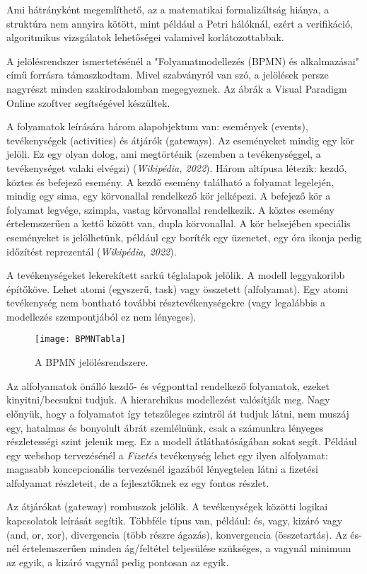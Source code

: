 \documentclass[12pt]{article}
\begin{document}
Ami hátrányként megemlíthető, az a matematikai formalizáltság hiánya, a struktúra nem annyira kötött, mint például a Petri hálóknál, ezért a verifikáció, algoritmikus vizsgálatok lehetőségei valamivel korlátozottabbak.

A jelölésrendszer ismertetésénél a "Folyamatmodellezés (BPMN) és alkalmazásai" című forrásra támaszkodtam. Mivel szabványról van szó, a jelölések persze nagyrészt minden szakirodalomban megegyeznek. Az ábrák a Visual Paradigm Online szoftver segítségével készültek.

A folyamatok leírására három alapobjektum van:  események (events), tevékenységek (activities) és átjárók (gateways).
Az eseményeket mindig egy kör jelöli. Ez egy olyan dolog, ami megtörténik (szemben a tevékenységgel, a tevékenységet valaki elvégzi) (\textit{Wikipédia, 2022}). Három altípusa létezik: kezdő, köztes és befejező esemény. A kezdő esemény található a folyamat legelején, mindig egy sima, egy körvonallal rendelkező kör jelképezi. A befejező kör a folyamat legvége, szimpla, vastag körvonallal rendelkezik. A köztes esemény értelemszerűen a kettő között van, dupla körvonallal. A kör belsejében speciális eseményeket is jelölhetünk, például egy boríték egy üzenetet, egy óra ikonja pedig időzítést reprezentál (\textit{Wikipédia, 2022}).

A tevékenységeket  lekerekített sarkú téglalapok jelölik. A modell leggyakoribb építőköve. Lehet atomi (egyszerű, task) vagy összetett (alfolyamat). Egy atomi tevékenység nem bontható további résztevékenységekre (vagy legalábbis a modellezés szempontjából ez nem lényeges).

\begin{figure}
\texttt{[image: BPMNTabla]}
\caption{A BPMN jelölésrendszere.}
\end{figure}

Az alfolyamatok önálló kezdő- és végponttal rendelkező folyamatok, ezeket kinyitni/becsukni tudjuk. A hierarchikus modellezést valósítják meg. Nagy előnyük, hogy a folyamatot így tetszőleges szintről át tudjuk látni, nem muszáj egy, hatalmas és bonyolult ábrát szemlélnünk, csak a számunkra lényeges részletességi szint jelenik meg. Ez a modell átláthatóságában sokat segít. Például egy webshop tervezésénél a \textit{Fizetés} tevékenység lehet egy ilyen alfolyamat: magasabb koncepcionális tervezésnél igazából lényegtelen látni a fizetési alfolyamat részleteit, de a fejlesztőknek ez egy fontos részlet.

Az átjárókat (gateway) rombuszok jelölik. A tevékenységek közötti logikai kapcsolatok leírását segítik. Többféle típus van, például: és, vagy, kizáró vagy (and, or, xor), divergencia (több részre ágazás), konvergencia (összetartás). Az és-nél értelemszerűen minden ág/feltétel teljesülése szükséges, a vagynál minimum az egyik, a kizáró vagynál pedig pontosan az egyik.
\end{document}
